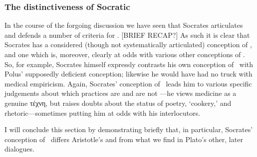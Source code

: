 \documentclass[11pt,letterpaper,oneside]{amsart} %
\begin{document}
%












\subsubsection*{The distinctiveness of Socratic \techne}

In the course of the forgoing discussion we have seen that Socrates articulates and defends a number of criteria for \techne. [BRIEF RECAP?] As such it is clear that Socrates has a considered (though not systematically articulated) conception of \techne, and one which is, moreover, clearly at odds with various other conceptions of \techne. So, for example, Socrates himself expressly contrasts his own conception of \techne\ with Polus' supposedly deficient conception; likewise he would have had no truck with medical empiricism. Again, Socrates' conception of \techne\ leads him to various specific judgements about which practices are and are not \techne---he views medicine as a genuine τέχνη, but raises doubts about the status of poetry, `cookery,' and rhetoric---sometimes putting him at odds with his interlocutors. 

I will conclude this section by demonstrating briefly that, in particular, Socrates' conception of \techne\ differs Aristotle's and from what we find in Plato's other, later dialogues.



\end{document}
